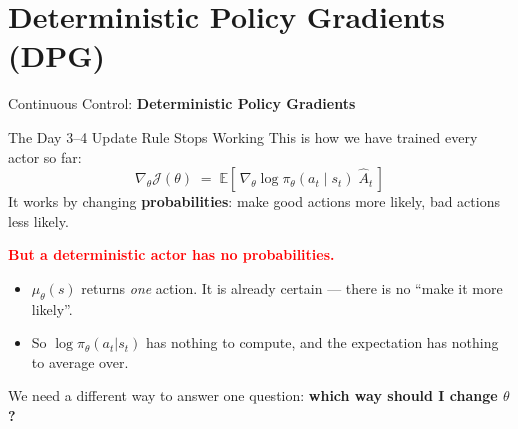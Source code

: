 %

\section{Deterministic Policy Gradients (DPG)}
\begin{frame}{}
    \LARGE Continuous Control: \textbf{Deterministic Policy Gradients}
\end{frame}

\begin{frame}{The Day 3--4 Update Rule Stops Working}
\vspace{0.6em}
This is how we have trained every actor so far:
\[
\nabla_\theta \mathcal{J}(\theta) \;=\; \mathbb{E}\!\left[\, \nabla_\theta \log \pi_\theta(a_t \mid s_t)\; \hat{A}_t \,\right]
\]
It works by changing \textbf{probabilities}: make good actions more likely, bad actions less likely.
\pause
\vspace{1.2em}

\textcolor{red}{\textbf{But a deterministic actor has no probabilities.}}
\vspace{0.5em}
\begin{itemize}
    \setlength{\itemsep}{0.45em}
    \item $\mu_\theta(s)$ returns \emph{one} action. It is already certain --- there is no ``make it more likely''.
    \item So $\log \pi_\theta(a_t|s_t)$ has nothing to compute, and the expectation has nothing to average over.
\end{itemize}
\vspace{0.8em}
\centering
We need a different way to answer one question: \textbf{which way should I change $\theta$?}
\end{frame}

